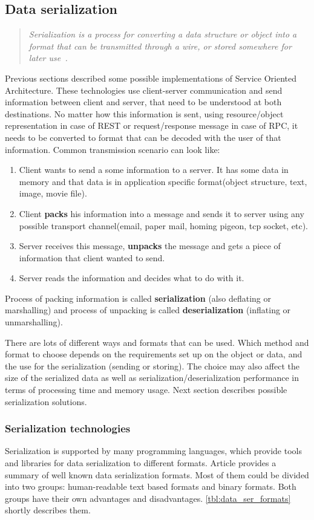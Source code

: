 \subsection{Data serialization}
\begin{quotation}
\textit{
Serialization is a process for converting a data structure or object into a format that
can be transmitted through a wire, or stored somewhere for later
use~\cite{json_vs_yaml}.
}
\end{quotation}
Previous sections described some possible implementations of Service Oriented
Architecture. These technologies use client-server communication and
send information between client and server, that need to be understood at both
destinations. No matter how this information is sent, using resource/object representation in case of REST or
request/response message in case of RPC, it needs to be converted to format that
can be decoded with the user of that information. Common transmission scenario
can look like:
\begin{enumerate}
  \item Client wants to send a some information to a server. It has some data in
  memory and that data is in application specific format(object structure, text,
  image, movie file).
  \item Client \textbf{packs} his information into a message and sends it to
  server using any possible transport channel(email, paper mail, homing pigeon, tcp
  socket, etc).
  \item Server receives this message, \textbf{unpacks} the message and gets a
  piece of information that client wanted to send.
  \item Server reads the information and decides what to do with it.
\end{enumerate}

Process of packing information is called \textbf{serialization} (also deflating
or marshalling) and process of unpacking is called \textbf{deserialization}
(inflating or unmarshalling). 

There are lots of different ways and formats that can
be used. Which method and format to choose depends on the requirements set up on
the object or data, and the use for the serialization (sending or storing). The choice
may also affect the size of the serialized data as well as serialization/deserialization
performance in terms of processing time and memory usage\cite{json_vs_yaml}.
Next section describes possible serialization solutions.

\subsubsection{Serialization technologies}
Serialization is supported by many programming languages, which provide tools
and libraries for data serialization to different formats. Article
\cite{wikipedia:comparison_of_data_serialization_formats}
provides a summary of well known data serialization formats.
Most of them could be divided into two groups: human-readable text based formats
and binary formats. Both groups have their own advantages and disadvantages.
\autoref{tbl:data_ser_formats} shortly describes them. 

